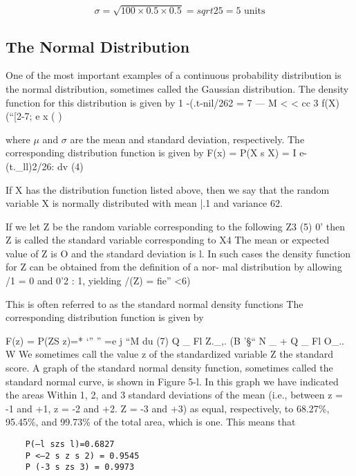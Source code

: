 \[ \sigma = \sqrt{100 \times 0.5 \times 0.5 } = sqrt{25} = \mbox{5 units}\]


\newpage
\subsection*{The Normal Distribution}

One of the most important examples of a continuous probability distribution is the normal distribution, sometimes called the Gaussian distribution. 
The density function for this distribution is given by
1 -(.t-nil/262
= 7 — M < < cc 3
f(X) (“[2-7; e x ( )

where $\mu$ and $\sigma$ are the mean and standard deviation, respectively. The
corresponding distribution function is given by
F(x) = P(X s X) =   I e-(t._ll)2/26: dv (4)

If X has the distribution function listed above, then we say that the
random variable X is normally distributed with mean |.1 and variance 62.

If we let Z be the random variable corresponding to the following
Z3 (5)
0'
then Z is called the standard variable corresponding to X4 The mean or
expected value of Z is O and the standard deviation is l. In such cases
the density function for Z can be obtained from the deﬁnition of a nor-
mal distribution by allowing /1 = 0 and 0'2 : 1, yielding
/(Z) = ﬁe” <6)

This is often referred to as the standard normal density functions
The corresponding distribution function is given by



F(z) = P(ZS z)=* ‘” ” =e j “M du (7)
Q _
Fl
Z._,.
(B
'§“
N _
+
Q _
Fl
O_..
W
We sometimes call the value z of the standardized variable Z the
standard score.
A graph of the standard normal density function, sometimes called
the standard normal curve, is shown in Figure 5-l. In this graph we
have indicated the areas Within 1, 2, and 3 standard deviations of the
mean (i.e., between z = -1 and +1, z = -2 and +2. Z = -3 and +3) as
equal, respectively, to 68.27\%, 95.45\%, and 99.73\% of the total area,
which is one. This means that
\begin{verbatim}
    P(—l szs l)=0.6827
	P <—2 s z s 2) = 0.9545
	P (-3 s zs 3) = 0.9973
\end{verbatim}

